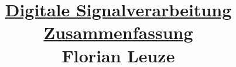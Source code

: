 

\null  %
\nointerlineskip  %
\vfill
\let\snewpage \newpage
\let\newpage \relax
\title{\underline{Digitale Signalverarbeitung Zusammenfassung} \\ $\;$ \\ $\;$ \\ Florian Leuze}
\date{}
\maketitle
\let \newpage \snewpage
\vfill 
\break %

